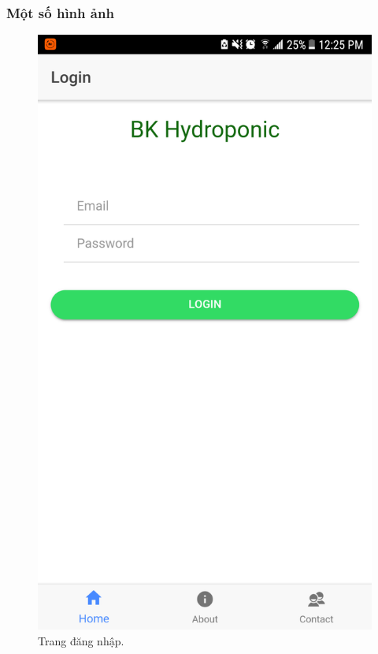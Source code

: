\documentclass[a4paper,12pt,oneside]{article}
\begin{document}
\subsubsection{Một số hình ảnh}

\begin{figure}[H]
\begin{center}
\includegraphics[scale=.25]{hinh/mobile_login.png}
\end{center}
\caption{Trang đăng nhập.}
\end{figure}
\end{document}
